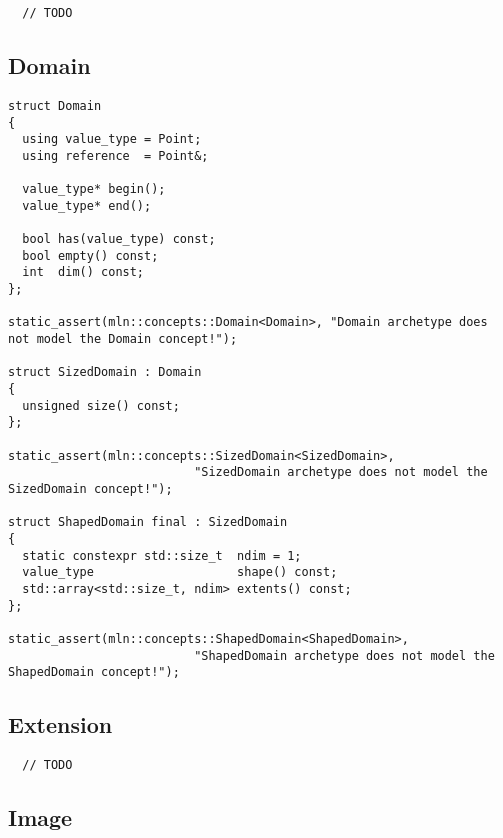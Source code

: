 \begin{verbatim}
  // TODO
\end{verbatim}


\subsection{Domain}

\begin{verbatim}
struct Domain
{
  using value_type = Point;
  using reference  = Point&;

  value_type* begin();
  value_type* end();

  bool has(value_type) const;
  bool empty() const;
  int  dim() const;
};

static_assert(mln::concepts::Domain<Domain>, "Domain archetype does not model the Domain concept!");

struct SizedDomain : Domain
{
  unsigned size() const;
};

static_assert(mln::concepts::SizedDomain<SizedDomain>,
                          "SizedDomain archetype does not model the SizedDomain concept!");

struct ShapedDomain final : SizedDomain
{
  static constexpr std::size_t  ndim = 1;
  value_type                    shape() const;
  std::array<std::size_t, ndim> extents() const;
};

static_assert(mln::concepts::ShapedDomain<ShapedDomain>,
                          "ShapedDomain archetype does not model the ShapedDomain concept!");
\end{verbatim}


\subsection{Extension}

\begin{verbatim}
  // TODO
\end{verbatim}


\subsection{Image}

